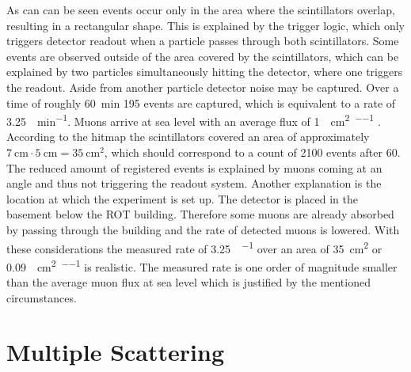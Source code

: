 \documentclass[sn-mathphys-num,iicol]{sn-jnl}
\theoremstyle{thmstyleone}
\theoremstyle{thmstyletwo}
\theoremstyle{thmstylethree}
\begin{document}
As can can be seen events occur only in the area where the scintillators overlap, resulting in a rectangular shape.
This is explained by the trigger logic, which only triggers detector readout when a particle passes through both scintillators.
Some events are observed outside of the area covered by the scintillators, which can be explained by two particles simultaneously hitting the detector, where one triggers the readout.
Aside from another particle detector noise may be captured.
Over a time of roughly \SI{60}{\minute} 195 events are captured, which is equivalent to a rate of \SI{3.25}{\per\minute}.
Muons arrive at sea level with an average flux of \SI{1}{\per\centi\meter\squared\per\min} \cite{muons}.
According to the hitmap the scintillators covered an area of approximately $\SI{7}{\centi\meter}\cdot\SI{5}{\centi\meter}=\SI{35}{\centi\meter\squared}$, which should correspond to a count of 2100 events after \SI{60}{\min}.
The reduced amount of registered events is explained by muons coming at an angle and thus not triggering the readout system.
Another explanation is the location at which the experiment is set up. 
The detector is placed in the basement below the ROT building. 
Therefore some muons are already absorbed by passing through the building and the rate of detected muons is lowered.
With these considerations the measured rate of \SI{3.25}{\per\min} over an area of \SI{35}{\centi\meter\squared} or \SI{0.09}{\per\centi\meter\squared\per\min} is realistic.
The measured rate is one order of magnitude smaller than the average muon flux at sea level which is justified by the mentioned circumstances. 


\section{Multiple Scattering}
\end{document}

